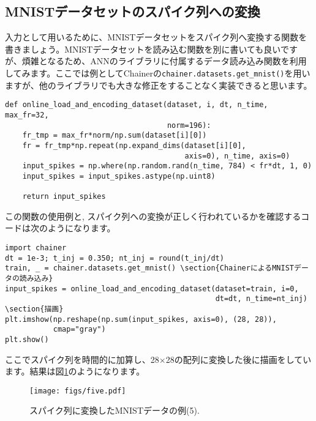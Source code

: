 \subsection{MNISTデータセットのスパイク列への変換}
入力として用いるために、MNISTデータセットをスパイク列へ変換する関数を書きましょう。MNISTデータセットを読み込む関数を別に書いても良いですが、煩雑となるため、ANNのライブラリに付属するデータ読み込み関数を利用してみます。ここでは例としてChainerの\texttt{chainer.datasets.get\_mnist()}を用いますが、他のライブラリでも大きな修正をすることなく実装できると思います。
\begin{verbatim}
def online_load_and_encoding_dataset(dataset, i, dt, n_time, max_fr=32,
                                     norm=196):
    fr_tmp = max_fr*norm/np.sum(dataset[i][0])
    fr = fr_tmp*np.repeat(np.expand_dims(dataset[i][0],
                                         axis=0), n_time, axis=0)
    input_spikes = np.where(np.random.rand(n_time, 784) < fr*dt, 1, 0)
    input_spikes = input_spikes.astype(np.uint8)

    return input_spikes
\end{verbatim}
この関数の使用例と, スパイク列への変換が正しく行われているかを確認するコードは次のようになります。
\begin{verbatim}
import chainer
dt = 1e-3; t_inj = 0.350; nt_inj = round(t_inj/dt)
train, _ = chainer.datasets.get_mnist() \section{ChainerによるMNISTデータの読み込み}
input_spikes = online_load_and_encoding_dataset(dataset=train, i=0,
                                                dt=dt, n_time=nt_inj)
\section{描画}
plt.imshow(np.reshape(np.sum(input_spikes, axis=0), (28, 28)),
           cmap="gray")
plt.show()
\end{verbatim}
ここでスパイク列を時間的に加算し、28$\times$28の配列に変換した後に描画をしています。結果は図\ref{fig:jitteredMNIST}のようになります。
\begin{figure}[htbp]
    \centering
    \texttt{[image: figs/five.pdf]}
    \caption{スパイク列に変換したMNISTデータの例(5).}
    \label{fig:jitteredMNIST}
\end{figure}

